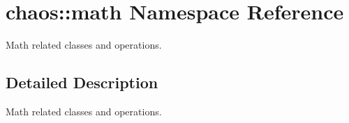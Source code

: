 \hypertarget{namespacechaos_1_1math}{\section{chaos\-:\-:math Namespace Reference}
\label{namespacechaos_1_1math}
}


Math related classes and operations.  




\subsection{Detailed Description}
Math related classes and operations. 